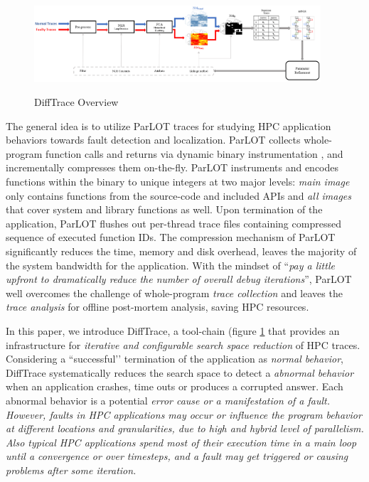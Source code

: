 \begin{figure}[]
\caption{DiffTrace Overview}
\includegraphics[width=0.95\textwidth]{figs/overview.png}
\label{fig.diffTraceOverview}
\end{figure}

The general idea is to utilize ParLOT \cite{ parlot} traces for studying HPC application behaviors towards fault detection and localization.
%
ParLOT collects whole-program function calls and returns via dynamic binary instrumentation \cite{pin}, and incrementally compresses them on-the-fly.
%
ParLOT instruments and encodes functions within the binary to unique integers at two major levels: \textit{main image} only contains functions from the source-code and included APIs and \textit{all images} that cover system and library functions as well.
%
Upon termination of the application, ParLOT flushes out per-thread trace files containing compressed sequence of executed function IDs.
%
The compression mechanism of ParLOT significantly reduces the time, memory and disk overhead, leaves the majority of the system bandwidth for the application. 
%
With the mindset of ``\textit{pay a little upfront to dramatically reduce the number of overall debug iterations}'', ParLOT well overcomes the challenge of whole-program \textit{trace collection} and leaves the \textit{trace analysis} for offline post-mortem analysis, saving HPC resources.
%

In this paper, we introduce DiffTrace, a tool-chain (figure \ref{fig.diffTraceOverview} that provides an infrastructure for \textit{iterative and configurable search space reduction} of HPC traces.
%
Considering a ``successful’’ termination of the application as \textit{normal behavior}, DiffTrace systematically reduces the search space to detect a \textit{abnormal behavior} when an application crashes, time outs or produces a corrupted answer.
%
Each abnormal behavior is a potential \em{error} cause or a manifestation of a \em{fault}.
%
However, faults in HPC applications may occur or influence the program behavior at different locations and granularities, due to high and hybrid level of parallelism.
%
Also typical HPC applications spend most of their execution time in a main loop until a convergence or over timesteps, and a fault may get  triggered or causing problems after some iteration.
%

